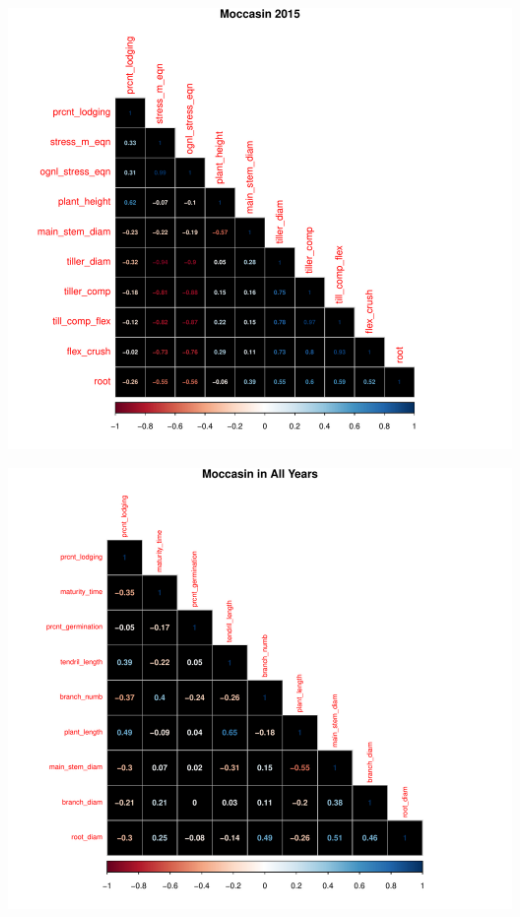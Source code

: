 \documentclass[11pt]{article}
\begin{document}
\begin{knitrout}\footnotesize
{}\color{fgcolor}

{\centering \includegraphics[width=\maxwidth]{figure/Moc15-1} 

}




{\centering \includegraphics[width=\maxwidth]{figure/Moc15-2} 

}



\end{knitrout}
\pagebreak
\end{document}
